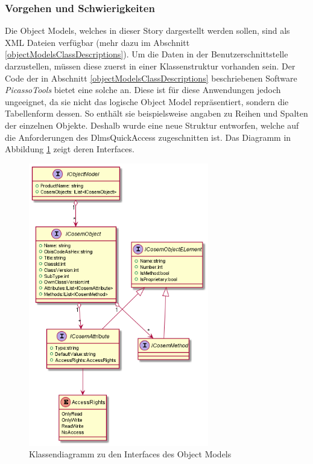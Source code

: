 \subsubsection{Vorgehen und Schwierigkeiten}\label{objectModelDevSchwierigkeiten}
Die Object Models, welches in dieser Story dargestellt werden sollen, sind als XML Dateien verfügbar (mehr dazu im Abschnitt \ref{objectModelsClassDescriptions}).
Um die Daten in der Benutzerschnittstelle darzustellen, müssen diese zuerst in einer Klassenstruktur vorhanden sein.
Der Code der in Abschnitt \ref{objectModelsClassDescriptions} beschriebenen Software \textit{PicassoTools} bietet eine solche an.
Diese ist für diese Anwendungen jedoch ungeeignet, da sie nicht das logische Object Model repräsentiert, sondern die Tabellenform dessen.
So enthält sie beispielsweise angaben zu Reihen und Spalten der einzelnen Objekte.
Deshalb wurde eine neue Struktur entworfen, welche auf die Anforderungen des DlmsQuickAccess zugeschnitten ist.
Das Diagramm in Abbildung \ref{fig:objectModelInterface} zeigt deren Interfaces.

\begin{figure}
   \centering
   \includegraphics[width=0.7\textwidth]{gfx/ObjectModel_interfaces.png}
   \caption{
      Klassendiagramm zu den Interfaces des Object Models
      }
      \label{fig:objectModelInterface}
\end{figure}

